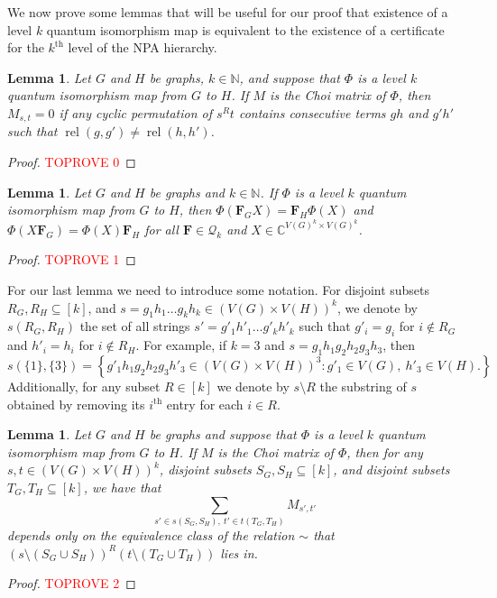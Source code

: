 \documentclass[11pt,a4paper]{article}
\theoremstyle{plain}
\newtheorem{lem}[thm]{Lemma}
\theoremstyle{remark}
\theoremstyle{definition}
\DeclareMathOperator{\rel}{rel}
\begin{document}
We now prove some lemmas that will be useful for our proof that existence of a level $k$ quantum isomorphism map is equivalent to the existence of a certificate for the $k^\text{th}$ level of the NPA hierarchy.

\begin{lem}\label{lem:Mzeros}
    Let $G$ and $H$ be graphs, $k \in \mathbb{N}$, and suppose that $\Phi$ is a level $k$ quantum isomorphism map from $G$ to $H$. If $M$ is the Choi matrix of $\Phi$, then $M_{s,t} = 0$ if any cyclic permutation of $s^Rt$ contains consecutive terms $gh$ and $g'h'$ such that $\rel(g,g') \ne \rel(h,h')$.
\end{lem}
\begin{proof}\textcolor{red}{TOPROVE 0}\end{proof}

\begin{lem}\label{lem:multiplicative}
    Let $G$ and $H$ be graphs and $k \in \mathbb{N}$. If $\Phi$ is a level $k$ quantum isomorphism map from $G$ to $H$, then $\Phi(\boldsymbol{F}_GX) = \boldsymbol{F}_H\Phi(X)$ and $\Phi(X\boldsymbol{F}_G) = \Phi(X)\boldsymbol{F}_H$ for all $\boldsymbol{F} \in \mathcal{Q}_k$ and $X \in \mathbb{C}^{V(G)^k \times V(G)^k}$.
\end{lem}
\begin{proof}\textcolor{red}{TOPROVE 1}\end{proof}




For our last lemma we need to introduce some notation. For disjoint subsets $R_G, R_H \subseteq [k]$, and $s = g_1h_1\ldots g_kh_k \in (V(G) \times V(H))^k$, we denote by $s(R_G,R_H)$ the set of all strings $s' = g'_1h'_1\ldots g'_kh'_k$ such that $g'_i = g_i$ for $i \notin R_G$ and $h'_i = h_i$ for $i \notin R_H$. For example, if $k = 3$ and $s = g_1h_1g_2h_2g_3h_3$, then 
\[s(\{1\},\{3\}) = \left\{g'_1h_1g_2h_2g_3h'_3 \in (V(G) \times V(H))^3 : g'_1 \in V(G), \ h'_3 \in V(H).\right\}\]
Additionally, for any subset $R \in [k]$ we denote by $s\setminus R$ the substring of $s$ obtained by removing its $i^\text{th}$ entry for each $i \in R$.



\begin{lem}\label{lem:Msums}
    Let $G$ and $H$ be graphs and suppose that $\Phi$ is a level $k$ quantum isomorphism map from $G$ to $H$. If $M$ is the Choi matrix of $\Phi$, then for any $s,t \in (V(G) \times V(H))^k$, disjoint subsets $S_G,S_H \subseteq [k]$, and disjoint subsets $T_G,T_H \subseteq [k]$, we have that
    \begin{equation}\label{eq:Msumlem}
        \sum_{s' \in s(S_G,S_H), \ t' \in t(T_G,T_H)} M_{s',t'}
    \end{equation}
    depends only on the equivalence class of the relation $\sim$ that $(s\setminus (S_G \cup S_H))^R(t\setminus (T_G \cup T_H))$ lies in.
\end{lem}
\begin{proof}\textcolor{red}{TOPROVE 2}\end{proof}
\end{document}
